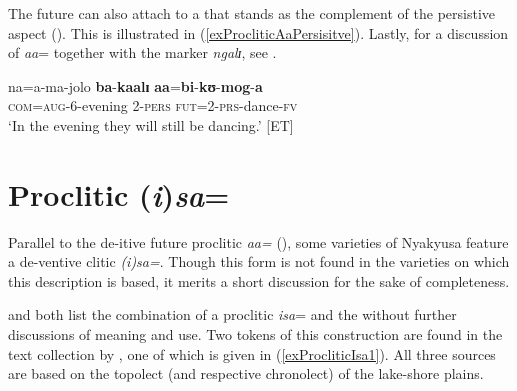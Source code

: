 The future  can also attach to a  that stands as the complement of the persistive aspect  (). This is illustrated in (\ref{exProcliticAaPersisitve}). Lastly, for a discussion of \textit{aa}= together with the  marker \textit{ngalɪ}, see .
\begin{exe}
\ex \label{exProcliticAaPersisitve}\gll na=a-ma-jolo \textbf{ba}-\textbf{kaalɪ} \textbf{aa}=\textbf{bi}-\textbf{kʊ}-\textbf{mog}-\textbf{a}\\
\textsc{com}=\textsc{aug}-6-evening 2-\textsc{pers} \textsc{fut}=2-\textsc{prs}-dance-\textsc{fv}\\
\glt `In the evening they will still be dancing.' [ET]
\end{exe}
\section{Proclitic (\textit{i})\textit{sa}=}\label{ProcliticIsa}
Parallel to the de-itive future proclitic \textit{aa=} (), some varieties of Nyakyusa feature a de-ventive clitic \textit{(i)sa=}. Though this form is not found in the varieties on which this description is based, it merits a short discussion for the sake of completeness.

\citet[31]{SchumannK1899} and \citet[54]{EndemannC1914} both list the combination of a proclitic \mbox{\textit{isa}=} and the  without further discussions of meaning and use. Two tokens of this construction are found in the text collection by \citet{BergerP1933}, one of which is given in (\ref{exProcliticIsa1}). All three sources are based on the topolect (and respective chronolect) of the lake-shore plains.

